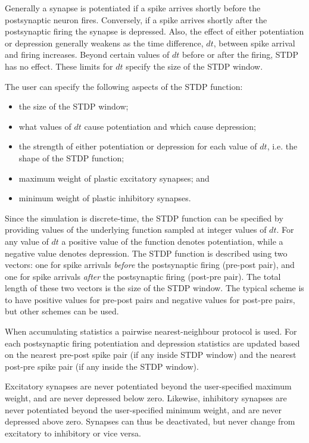 \documentclass[a4paper]{article}
\begin{document}
Generally a synapse is potentiated if a spike arrives shortly before the postsynaptic neuron fires. 
Conversely, if a spike arrives shortly after the postsynaptic firing the synapse is depressed. 
Also, the effect of either potentiation or depression generally weakens as the time difference, $dt$, 
	between spike arrival and firing increases. 
Beyond certain values of $dt$ before or after the firing, STDP has no effect. 
These limits for $dt$ specify the size of the STDP window.

The user can specify the following aspects of the STDP function:

\begin{itemize}
	\item the size of the STDP window;
	\item what values of $dt$ cause potentiation and which cause depression;
	\item the strength of either potentiation or depression for each value of $dt$, 
		i.e. the shape of the STDP function;
	\item maximum weight of plastic excitatory synapses; and
	\item minimum weight of plastic inhibitory synapses.
\end{itemize}

Since the simulation is discrete-time,
	the STDP function can be specified by providing values of the underlying function
	sampled at integer values of $dt$.
For any value of $dt$ a positive value of the function denotes potentiation, 
	while a negative value denotes depression.
The STDP function is described using two vectors: 
	one for spike arrivals \emph{before} the postsynaptic firing (pre-post pair),
	and one for spike arrivals \emph{after} the postsynaptic firing (post-pre pair).
The total length of these two vectors is the size of the STDP window.
The typical scheme is to have positive values for pre-post pairs and negative values for post-pre pairs,
but other schemes can be used.

When accumulating statistics a pairwise nearest-neighbour protocol is used.
For each postsynaptic firing potentiation and depression statistics are updated based
on the nearest pre-post spike pair (if any inside STDP window) 
and the nearest post-pre spike pair (if any inside the STDP window).

Excitatory synapses are never potentiated beyond the user-specified maximum weight,
and are never depressed below zero.
Likewise, inhibitory synapses are never potentiated beyond the  user-specified minimum weight,
and are never depressed above zero.
Synapses can thus be deactivated, but never change from excitatory to inhibitory or vice versa.







\end{document}
